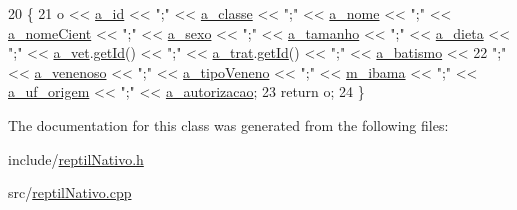 \begin{DoxyCode}
20 \{
21     o << \hyperlink{classAnimal_a1eab12d1133a739dc0fea720cf6cc927}{a\_id} << \textcolor{stringliteral}{";"} << \hyperlink{classAnimal_a1f32b4455559489b5f5dce71913a6f8f}{a\_classe} << \textcolor{stringliteral}{";"} << \hyperlink{classAnimal_ad815bbe345d7c5274858ac8ccb24bc52}{a\_nome} << \textcolor{stringliteral}{";"} << 
      \hyperlink{classAnimal_af2ae0fc23b0eaf3edaee4579f6199dfc}{a\_nomeCient} << \textcolor{stringliteral}{";"} << \hyperlink{classAnimal_af2b1c520d145f82af7a5a88bb4271a0d}{a\_sexo} << \textcolor{stringliteral}{";"} << \hyperlink{classAnimal_a72366b060dfdbc0dd074fbe41decfcc2}{a\_tamanho} << \textcolor{stringliteral}{";"} << 
      \hyperlink{classAnimal_a32088524517a531af269e3ec04275135}{a\_dieta} << \textcolor{stringliteral}{";"} << \hyperlink{classAnimal_a12ce5681957e27dae674cbbde7fb1e4f}{a\_vet}.\hyperlink{classFuncionario_a0288286a907e587b7ab75d6c23354a06}{getId}() << \textcolor{stringliteral}{";"} << \hyperlink{classAnimal_a19fbf607b29b06a86f598dd1ffb8c712}{a\_trat}.\hyperlink{classFuncionario_a0288286a907e587b7ab75d6c23354a06}{getId}() << \textcolor{stringliteral}{";"} << 
      \hyperlink{classAnimal_a4e308163c5b3d82e546fb39b399bcb71}{a\_batismo} <<
22     \textcolor{stringliteral}{";"} << \hyperlink{classReptil_ab2ebc4cb4f0cf56587b59fdb0d130cf5}{a\_venenoso} << \textcolor{stringliteral}{";"} << \hyperlink{classReptil_ac9ca9b337ca21b72b0ef77b3904b56b7}{a\_tipoVeneno} << \textcolor{stringliteral}{";"} << 
      \hyperlink{classAnimalSilvestre_a4c92c625318b23e550b8bb24fb934d14}{m\_ibama} << \textcolor{stringliteral}{";"} << \hyperlink{classNativo_a260f26d7ad44221c1dca0ec01183482a}{a\_uf\_origem} << \textcolor{stringliteral}{";"} << \hyperlink{classNativo_a1dc025166815eb0f250ce58330e4fbcb}{a\_autorizacao};
23     \textcolor{keywordflow}{return} o;
24 \}\end{DoxyCode}


The documentation for this class was generated from the following files\+:\begin{DoxyCompactItemize}
\item 
include/\hyperlink{reptilNativo_8h}{reptil\+Nativo.\+h}\item 
src/\hyperlink{reptilNativo_8cpp}{reptil\+Nativo.\+cpp}\end{DoxyCompactItemize}
